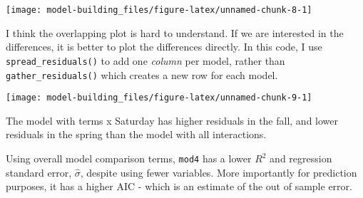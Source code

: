 \documentclass[]{book}
\newenvironment{Shaded}{\begin{snugshade}}{\end{snugshade}}
\newcommand{\CommentTok}[1]{\textcolor[rgb]{0.56,0.35,0.01}{\textit{#1}}}
\newcommand{\DataTypeTok}[1]{\textcolor[rgb]{0.13,0.29,0.53}{#1}}
\newcommand{\FloatTok}[1]{\textcolor[rgb]{0.00,0.00,0.81}{#1}}
\newcommand{\KeywordTok}[1]{\textcolor[rgb]{0.13,0.29,0.53}{\textbf{#1}}}
\newcommand{\NormalTok}[1]{#1}
\newcommand{\OperatorTok}[1]{\textcolor[rgb]{0.81,0.36,0.00}{\textbf{#1}}}
\newcommand{\StringTok}[1]{\textcolor[rgb]{0.31,0.60,0.02}{#1}}
\theoremstyle{plain}
\theoremstyle{remark}
\theoremstyle{definition}
\theoremstyle{definition}
\theoremstyle{definition}
\theoremstyle{remark}
\begin{document}
\begin{center}\texttt{[image: model-building\_files/figure-latex/unnamed-chunk-8-1]} \end{center}

I think the overlapping plot is hard to understand. If we are interested
in the differences, it is better to plot the differences directly. In
this code, I use \texttt{spread\_residuals()} to add one \emph{column}
per model, rather than \texttt{gather\_residuals()} which creates a new
row for each model.

\begin{Shaded}
\end{Shaded}

\begin{center}\texttt{[image: model-building\_files/figure-latex/unnamed-chunk-9-1]} \end{center}

The model with terms x Saturday has higher residuals in the fall, and
lower residuals in the spring than the model with all interactions.

Using overall model comparison terms, \texttt{mod4} has a lower \(R^2\)
and regression standard error, \(\hat\sigma\), despite using fewer
variables. More importantly for prediction purposes, it has a higher AIC
- which is an estimate of the out of sample error.

\begin{Shaded}
\end{Shaded}
\end{document}
